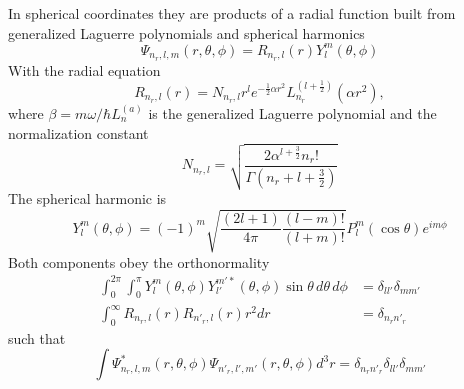 \documentclass[../../../main.tex]{subfiles}
\begin{document}
In spherical coordinates they are products of a radial function built from generalized Laguerre polynomials and spherical harmonics
\begin{equation*}
  \Psi_{n_{r},l,m}(r, \theta, \phi) = R_{n_{r},l}(r) Y_{l}^{m}(\theta, \phi)
\end{equation*}
With the radial equation
\begin{equation*}
  R_{n_{r},l}(r) = N_{n_{r},l} r^{l} e^{-\frac{1}{2}\alpha r^{2}} L_{n_{r}}^{(l + \frac{1}{2})}(\alpha r^{2}),
\end{equation*}
where $\beta=m\omega/\hbar$$ L_n^{(a)}$ is the generalized Laguerre polynomial and the normalization constant
  \begin{equation*}
    N_{n_r,l} = \sqrt{\frac{2 \alpha^{l+\frac{3}{2}} n_r!}{\Gamma(n_r + l + \frac{3}{2})}}
  \end{equation*}
  The spherical harmonic is
  \begin{equation*}
    Y_{l}^{m}(\theta, \phi) = (-1)^{m} \sqrt{\frac{(2l + 1)}{4\pi} \frac{(l - m)!}{(l + m)!}} P_{l}^{m}(\cos\theta) e^{im\phi}
  \end{equation*}
  Both components obey the orthonormality
  \begin{align*}
    \int_{0}^{2\pi} \int_{0}^{\pi} Y_{l}^{m}(\theta, \phi) Y_{l'}^{m'*}(\theta, \phi) \sin \theta \,d\theta \,d\phi & =  \delta_{ll'} \delta_{mm'} \\
    \int_{0}^{\infty} R_{n_r,l}(r) R_{n'_r,l}(r) r^2 dr                                                             & =  \delta_{n_r n'_r}
  \end{align*}
  such that
  \begin{equation*}
    \int \Psi_{n_r,l,m}^{*}(r, \theta, \phi) \Psi_{n'_r,l',m'}(r, \theta, \phi) d^3r = \delta_{n_r n'_r} \delta_{ll'} \delta_{mm'}
  \end{equation*}
\end{document}
